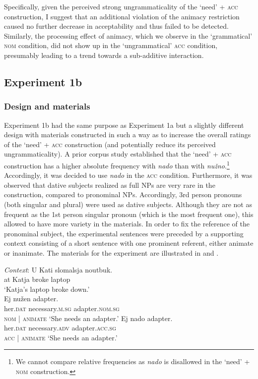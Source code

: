 \documentclass[output=paper,colorlinks,citecolor=brown]{langscibook}
\begin{document}
Specifically, given the perceived strong ungrammaticality of the `need' + \textsc{acc} construction, I suggest that an additional violation of the animacy restriction caused no further decrease in acceptability and thus failed to be detected. Similarly, the processing effect of animacy, which we observe in the `grammatical' \textsc{nom} condition, did not show up in the `ungrammatical' \textsc{acc} condition, presumably leading to a trend towards a sub-additive interaction.

\subsection{Experiment 1b}

\subsubsection{Design and materials}

Experiment 1b had the same purpose as Experiment 1a but a slightly different design with materials constructed in such a way as to increase the overall ratings of the `need' + \textsc{acc} construction (and potentially reduce its perceived ungrammaticality). A prior corpus study established that the `need' + \textsc{acc} construction has a higher absolute frequency with \textit{nado} than with \textit{nužno}.\footnote{We cannot compare relative frequencies as \textit{nado} is disallowed in the `need' + \textsc{nom} construction.} Accordingly, it was decided to use \textit{nado} in the \textsc{acc} condition. Furthermore, it was observed that dative subjects realized as full NPs are very rare in the construction, compared to pronominal NPs. Accordingly, 3rd person pronouns (both singular and plural) were used as dative subjects. Although they are not as frequent as the 1st person singular pronoun (which is the most frequent one), this allowed to have more variety in the materials. In order to fix the reference of the pronominal subject, the experimental sentences were preceded by a supporting context consisting of a short sentence with one prominent referent, either animate or inanimate. The materials for the experiment are illustrated in  and .

\ea \label{materials-exp1b-anim} \gll \textit{Context}: U Kati slomalsja noutbuk.
\\
{} at Katja broke laptop\\
\glt \hspace{1.3cm} `Katja's laptop broke down.'\\
\ea \gll Ej nužen adapter.\\
her.\textsc{dat} necessary.\textsc{m.sg} adapter.\textsc{nom.sg}\\ \hfill \textsc{nom} | \textsc{animate}
\glt `She needs an adapter.'
\ex \gll Ej nado adapter.\\
her.\textsc{dat} necessary.\textsc{adv} adapter.\textsc{acc.sg}\\ \hfill \textsc{acc} | \textsc{animate}
\glt `She needs an adapter.'
\z \z
\end{document}

